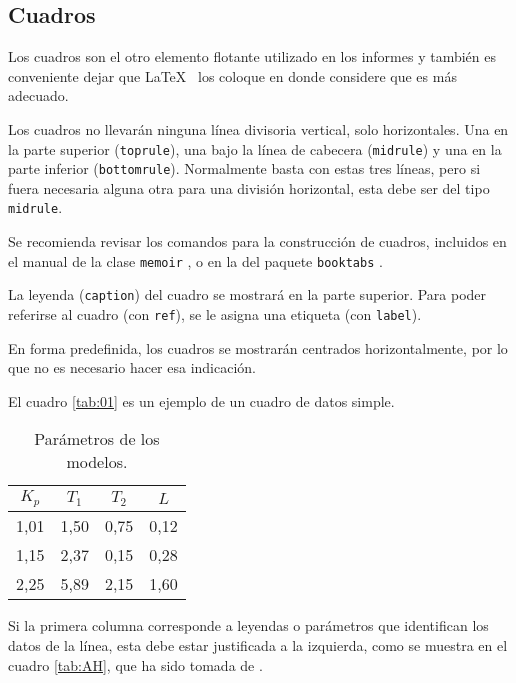 \subsection{Cuadros}
Los cuadros son el otro elemento flotante utilizado en los informes y también es conveniente dejar que \LaTeX~ los coloque en donde considere que es más adecuado.

Los cuadros no llevarán ninguna línea divisoria vertical, solo horizontales. Una en la parte superior (\texttt{toprule}), una bajo la línea de cabecera (\texttt{midrule}) y una en la parte inferior (\texttt{bottomrule}).  Normalmente basta con estas tres líneas, pero si fuera necesaria alguna otra para una división horizontal, esta debe ser del tipo \texttt{midrule}.

Se recomienda revisar los comandos para la construcción de cuadros, incluidos en el manual de la clase \texttt{memoir} \citep{memoir2011}, o en la del paquete \texttt{booktabs} \citep{fear2005}.

La leyenda (\texttt{caption}) del cuadro se mostrará en la parte superior.  Para poder referirse al cuadro (con \texttt{ref}), se le asigna una etiqueta (con \texttt{label}).

En forma predefinida, los cuadros se mostrarán centrados horizontalmente, por lo que no es necesario hacer esa indicación. 

El cuadro \ref{tab:01} es un ejemplo de un cuadro de datos simple.

\begin{table}
\caption{Parámetros de los modelos.} \label{tab:01o}
		\begin{tabular}{@{}*{4}{c}@{}}
    \toprule
    $K_p$ & $T_1$ & $T_2$ & $L$ \\
    \midrule
     1,01 & 1,50 & 0,75 & 0,12 \\
		 1,15 & 2,37 & 0,15 & 0,28 \\
		 2,25 & 5,89 & 2,15 & 1,60 \\
    \bottomrule
    \end{tabular}
\end{table}

Si la primera columna corresponde a leyendas o parámetros que identifican los datos de la línea, esta debe estar justificada a la izquierda, como se muestra en el cuadro \ref{tab:AH}, que ha sido tomada de \cite{astromhagglund2006}.

